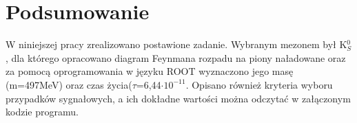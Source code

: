 \section{Podsumowanie}
W niniejszej pracy zrealizowano postawione zadanie. Wybranym mezonem był 
K$^0_S$, dla którego opracowano diagram Feynmana rozpadu na piony naładowane 
oraz za pomocą oprogramowania w języku ROOT wyznaczono jego masę (m=497MeV) oraz czas życia($\tau$=6,44$\cdot 10^{-11}$.
Opisano również kryteria wyboru przypadków sygnałowych, a ich dokładne wartości można odczytać w załączonym kodzie
programu.
